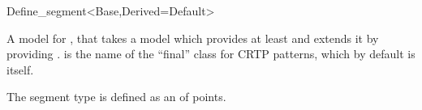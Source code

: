 \begin{ccRefClass}{Define_segment<Base,Derived=Default>}

\ccDefinition
A model for , that takes a  model 
which provides at least  and extends it by providing
.
 is the name of the ``final'' class for CRTP patterns,
which by default is  itself.

\ccIsModel
{}

\ccImplementation
The segment type is defined as an  of points.

\end{ccRefClass}

